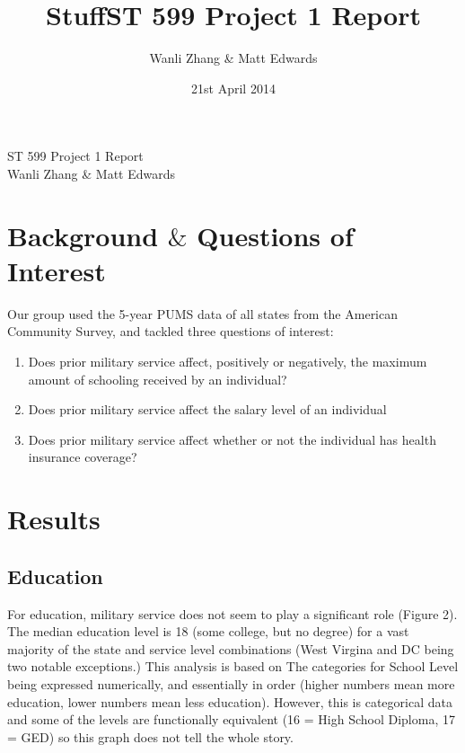 \documentclass{article}
\title{\vspace{-2.0cm}Stuff}
\title{ST 599 Project 1 Report}
\author{Wanli Zhang \& Matt Edwards}
\date{21st April 2014}
\begin{document}


\begingroup  
  \centering
  \LARGE ST 599 Project 1 Report\\[1em]
  \large Wanli Zhang \& Matt Edwards\par
\endgroup

\section{Background $\&$ Questions of Interest}
Our group used the 5-year PUMS data of all states from the American Community Survey, and tackled three questions of interest:

\begin{enumerate}

\item Does prior military service affect, positively or negatively, the maximum amount of schooling received by an individual? %
\item Does prior military service affect the salary level of an individual
\item Does prior military service affect whether or not the individual has health insurance coverage? 
\end{enumerate}


\section{Results}
\subsection{Education}
For education, military service does not seem to play a significant role (Figure 2). The median education level is 18 (some college, but no degree) for a vast majority of the state and service level combinations (West Virgina and DC being two notable exceptions.) This analysis is based on The categories for School Level being expressed numerically, and essentially in order (higher numbers mean more education, lower numbers mean less education). However, this is categorical data and some of the levels are functionally equivalent (16 = High School Diploma, 17 = GED) so this graph does not tell the whole story.
\end{document}
